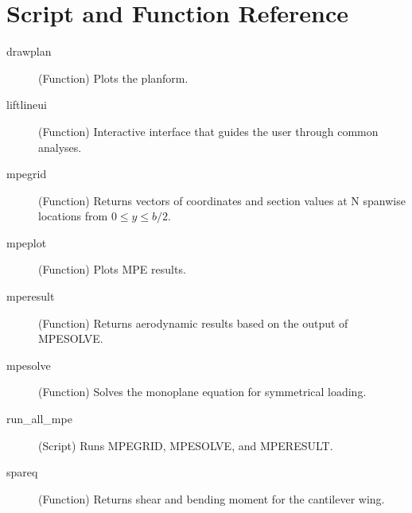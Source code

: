 \documentclass{article}
\begin{document}
\section{Script and Function Reference}
\begin{description}
  
  \item[drawplan] (Function) Plots the planform.

  \item[liftlineui] (Function) Interactive interface that guides the
    user through common analyses.

  \item[mpegrid] (Function) Returns vectors of coordinates and section
    values at N spanwise locations from $0 \leq y \leq b/2$.

  \item[mpeplot] (Function) Plots MPE results.

  \item[mperesult] (Function) Returns aerodynamic results based on the
    output of MPESOLVE.    

  \item[mpesolve] (Function) Solves the monoplane equation for
    symmetrical loading.

  \item[run\_all\_mpe] (Script) Runs MPEGRID, MPESOLVE, and MPERESULT.

  \item[spareq] (Function) Returns shear and bending moment for the
    cantilever wing.

\end{description}
\newpage
\printbibliography
\end{document}
